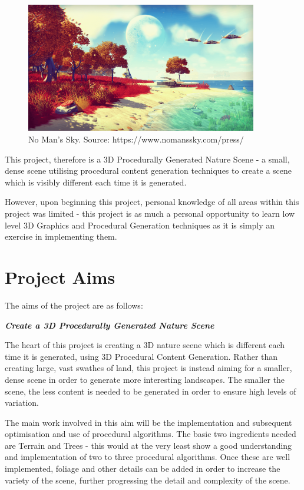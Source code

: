\documentclass[a4paper,10pt]{report}
\begin{document}
\begin{figure}[h!]
    \centering
  \includegraphics[width=0.9\textwidth]{NoMansSky}
 \caption{No Man's Sky. Source: https://www.nomanssky.com/press/}
 \label{fig:no_mans_sky}
\end{figure}


This project, therefore is a 3D Procedurally Generated Nature Scene - a small, dense scene utilising procedural content generation techniques to create a  scene which is visibly different each time it is generated. \medskip

However, upon beginning this project, personal knowledge of all areas within this project was limited - this project is as much a personal opportunity to learn low level 3D Graphics and Procedural Generation techniques as it is simply an exercise in implementing them. 

\section{Project Aims}
The aims of the project are as follows:\medskip

\textbf{\textit{Create a 3D Procedurally Generated Nature Scene}} \medskip

The heart of this project is creating a 3D nature scene which is different each time it is generated, using 3D Procedural Content Generation. Rather than creating large, vast swathes of land, this project is instead aiming for a smaller, dense scene in order to generate more interesting landscapes. The smaller the scene, the less content is needed to be generated in order to ensure high levels of variation.\medskip

The main work involved in this aim will be the implementation and subsequent optimisation and use of procedural algorithms. The basic two ingredients needed are Terrain and Trees - this would at the very least show a good understanding and implementation of two to three procedural algorithms. Once these are well implemented, foliage and other details can be added in order to increase the variety of the scene, further progressing the detail and complexity of the scene.  \medskip
\end{document}

